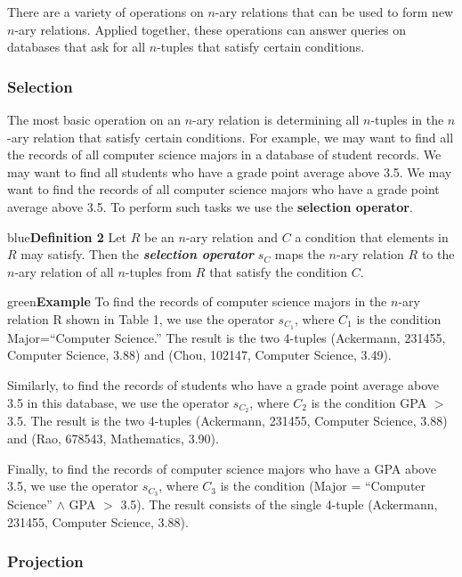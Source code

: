 \documentclass[11pt]{article}
\newenvironment{example}[1][\unskip]{\begin{mybox}{green}{\textbf{Example} {#1}}}{\end{mybox}}
\newenvironment{definition}[1]{\begin{mybox}{blue}{\textbf{Definition #1}}}{\end{mybox}}
\begin{document}
There are a variety of operations on $n$-ary relations that can be used to form new $n$-ary relations. Applied together, these operations can answer queries on databases that ask for all $n$-tuples that satisfy certain conditions.

\subsubsection{Selection}

The most basic operation on an $n$-ary relation is determining all $n$-tuples in the $n$-ary relation that satisfy certain conditions. For example, we may want to find all the records of all computer science majors in a database of student records. We may want to find all students who have a grade point average above 3.5. We may want to find the records of all computer science majors who have a grade point average above 3.5. To perform such tasks we use the \textbf{selection operator}.

\begin{definition}{2}
Let $R$ be an $n$-ary relation and $C$ a condition that elements in $R$ may satisfy. Then the \textit{\textbf{selection operator}} $s_C$ maps the $n$-ary relation $R$ to the $n$-ary relation of all $n$-tuples from $R$ that satisfy the condition $C$.
\end{definition}

\begin{example}
To find the records of computer science majors in the $n$-ary relation R shown in Table 1, we use the operator $s_{C_1}$, where $C_1$ is the condition Major=“Computer Science.” The result is the two 4-tuples (Ackermann, 231455, Computer Science, 3.88) and (Chou, 102147, Computer Science,
3.49). 

Similarly, to find the records of students who have a grade point average above 3.5 in this database, we use the operator $s_{C_2}$, where $C_2$ is the condition GPA $>$ 3.5. The result is the two 4-tuples (Ackermann, 231455, Computer Science, 3.88) and (Rao, 678543, Mathematics, 3.90). 

Finally, to find the records of computer science majors who have a GPA above 3.5, we use the operator $s_{C_3}$, where $C_3$ is the condition (Major = “Computer Science” $\land$ GPA $>$ 3.5). The result consists of the single 4-tuple (Ackermann, 231455, Computer Science, 3.88).
\end{example}

\subsubsection{Projection}
\end{document}
